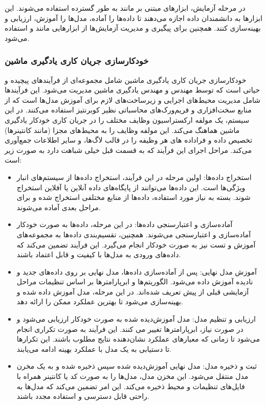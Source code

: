 در مرحله آزمایش، ابزارهای مبتنی بر  مانند  \cite{Jupyter} به طور گسترده استفاده می‌شوند. این ابزارها به دانشمندان داده اجازه می‌دهند تا داده‌ها را آماده، مدل‌ها را آموزش، ارزیابی و بهینه‌سازی کنند. همچنین برای پیگیری و مدیریت آزمایش‌ها از ابزارهایی مانند  و  استفاده می‌شود.

\subsubsection{خودکارسازی جریان کاری یادگیری ماشین}
خودکارسازی جریان کاری یادگیری ماشین شامل مجموعه‌ای از فرآیندهای پیچیده و حیاتی است که توسط مهندس  و مهندس یادگیری ماشین مدیریت می‌شود. این فرآیندها شامل مدیریت محیط‌های اجرایی و زیرساخت‌های لازم برای آموزش مدل‌ها است که از منابع سخت‌افزاری و فریم‌ورک‌های محاسباتی نظیر کوبرنتیز استفاده می‌کنند. در این سیستم، یک مولفه ارکستراسیون وظایف مختلف را در جریان کاری خودکار یادگیری ماشین هماهنگ می‌کند. این مولفه وظایف را به محیط‌های مجزا (مانند کانتینرها) تخصیص داده و فراداده های هر وظیفه را در قالب لاگ‌ها، و سایر اطلاعات جمع‌آوری می‌کند. مراحل اجرای این فرآیند که به قسمت قبل خیلی شباهت دارد به صورت زیر است:
\begin{itemize}
	\item
استخراج داده‌ها:
	اولین مرحله در این فرآیند، استخراج داده‌ها از سیستم‌های انبار ویژگی‌ها است. این داده‌ها می‌توانند از پایگاه‌های داده آنلاین یا آفلاین استخراج شوند. بسته به نیاز مورد استفاده، داده‌ها از منابع مختلفی استخراج شده و برای مراحل بعدی آماده می‌شوند.
	\item
آماده‌سازی و اعتبارسنجی داده‌ها:
در این مرحله، داده‌ها به صورت خودکار آماده‌سازی و اعتبارسنجی می‌شوند. همچنین، تقسیم‌بندی داده‌ها به مجموعه‌های آموزش و تست نیز به صورت خودکار انجام می‌گیرد. این فرآیند تضمین می‌کند که داده‌های ورودی به مدل‌ها با کیفیت و قابل اعتماد باشند.
	\item
آموزش مدل نهایی:
پس از آماده‌سازی داده‌ها، مدل نهایی بر روی داده‌های جدید و نادیده آموزش داده می‌شود. الگوریتم‌ها و ابرپارامترها بر اساس تنظیمات مراحل آزمایشی قبلی از پیش تعریف شده‌اند. در این مرحله، مدل آموزش داده شده و بهینه‌سازی می‌شود تا بهترین عملکرد ممکن را ارائه دهد.
	\item
ارزیابی و تنظیم مدل:
	مدل آموزش‌دیده شده به صورت خودکار ارزیابی می‌شود و در صورت نیاز، ابرپارامترها تغییر می کنند. این فرآیند به صورت تکراری انجام می‌شود تا زمانی که معیارهای عملکرد نشان‌دهنده نتایج مطلوب باشند. این تکرارها تا دستیابی به یک مدل با عملکرد بهینه ادامه می‌یابند.
	\item
ثبت و ذخیره مدل:
	مدل نهایی آموزش‌دیده شده سپس ذخیره شده و به یک مخرن مدل منتقل می‌شود. این مخزن مدل، مدل‌ها را به صورت کد یا کانتینر همراه با فایل‌های تنظیمات و محیط ذخیره می‌کند. این امر تضمین می‌کند که مدل‌ها به راحتی قابل دسترسی و استفاده مجدد باشند.
\end{itemize}


